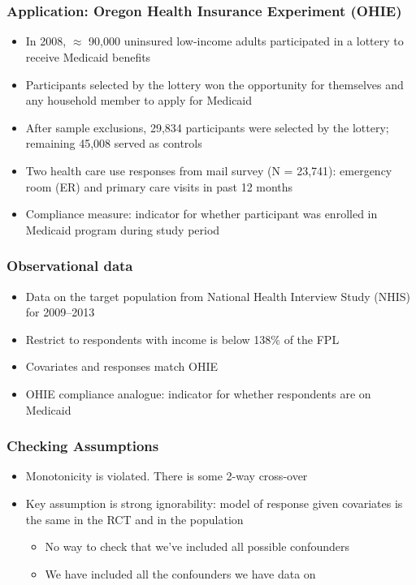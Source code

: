 \documentclass{beamer}
\begin{document}
\section[Application]{}

\begin{frame}
\frametitle{Application: Oregon Health Insurance Experiment (OHIE)}
\begin{itemize}
\item In 2008, $\approx$ 90,000 uninsured low-income adults participated in a lottery to receive Medicaid benefits \citep{finkelstein2012}
\item Participants selected by the lottery won the opportunity for themselves and any household member to apply for Medicaid
\item After sample exclusions, 29,834 participants were selected by the lottery; remaining 45,008 served as controls 
\item Two health care use responses from mail survey (N = 23,741): emergency room (ER) and primary care visits in past 12 months
\item Compliance measure: indicator for whether participant was enrolled in Medicaid program during study period
\end{itemize}
\end{frame}

\begin{frame}
\frametitle{Observational data}
\begin{itemize}
\item Data on the target population from National Health Interview Study (NHIS) \cite{NHIS} for 2009--2013
\item Restrict to respondents with income is below 138\% of the FPL
\item Covariates and responses match OHIE
\item OHIE compliance analogue: indicator for whether respondents are on Medicaid
\end{itemize}
\end{frame}

\begin{frame}
\frametitle{Checking Assumptions} %
\begin{itemize}
\item Monotonicity is violated. There is some 2-way cross-over
\item Key assumption is strong ignorability: model of response given covariates is the same in the RCT and in the population
\begin{itemize}
\item No way to check that we've included all possible confounders
\item We have included all the confounders we have data on
\end{itemize}
\end{itemize}
\end{frame}
\end{document}
